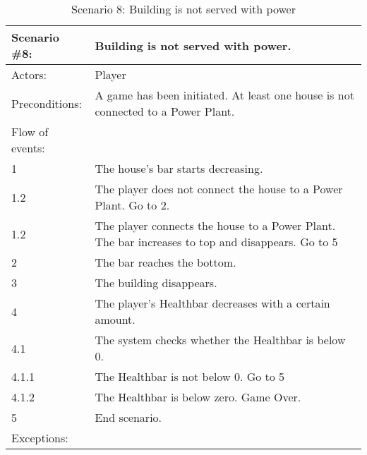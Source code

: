 \begin{table}
	\begin{tabular}{| l | p{10cm} |}
		\hline
		\rowcolor{lightgray}
		{\bf Scenario \#8:} & {\bf Building is not served with power.} \\ \hline
		Actors: & Player \\ \hline
		Preconditions: & A game has been initiated. At least one house is not connected to a Power Plant. \\ \hline
		\rowcolor{lightergray}
		Flow of events: & \\ \hline
		1 & The house's bar starts decreasing. \\ \hline
		1.2 & The player does not connect the house to a Power Plant. Go to 2. \\ \hline
		1.2 & The player connects the house to a Power Plant. The bar increases to top and disappears. Go to 5 \\ \hline
		2 & The bar reaches the bottom. \\ \hline
		3 & The building disappears. \\ \hline
		4 & The player's Healthbar decreases with a certain amount. \\ \hline
		4.1 & The system checks whether the Healthbar is below 0. \\ \hline
		4.1.1 & The Healthbar is not below 0. Go to 5 \\ \hline
		4.1.2 & The Healthbar is below zero. Game Over. \\ \hline
		5 & End scenario. \\ \hline
		\rowcolor{lightergray}
		Exceptions: & \\ \hline	
	\end{tabular}
	\caption{Scenario 8: Building is not served with power}
\end{table}

